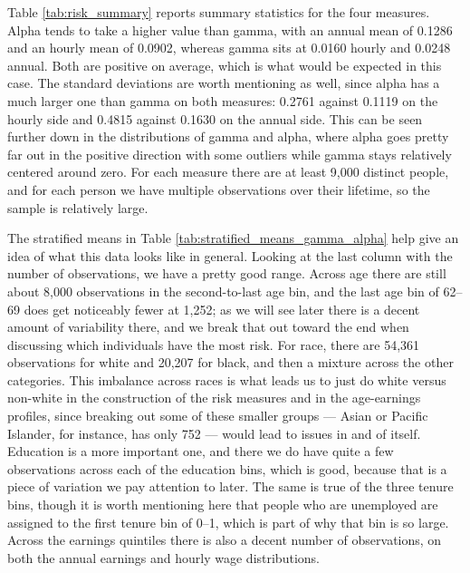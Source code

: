 \documentclass[12pt]{article}
\begin{document}
\begin{onehalfspace}
Table \ref{tab:risk_summary} reports summary statistics for the four measures. Alpha tends to take a higher value than gamma, with an annual mean of 0.1286 and an hourly mean of 0.0902, whereas gamma sits at 0.0160 hourly and 0.0248 annual. Both are positive on average, which is what would be expected in this case. The standard deviations are worth mentioning as well, since alpha has a much larger one than gamma on both measures: 0.2761 against 0.1119 on the hourly side and 0.4815 against 0.1630 on the annual side. This can be seen further down in the distributions of gamma and alpha, where alpha goes pretty far out in the positive direction with some outliers while gamma stays relatively centered around zero. For each measure there are at least 9,000 distinct people, and for each person we have multiple observations over their lifetime, so the sample is relatively large.


\begin{table}[H]
    \centering
    \caption{Summary Statistics of the Risk Measures}
    \label{tab:risk_summary}
    
\end{table}


The stratified means in Table \ref{tab:stratified_means_gamma_alpha} help give an idea of what this data looks like in general. Looking at the last column with the number of observations, we have a pretty good range. Across age there are still about 8,000 observations in the second-to-last age bin, and the last age bin of 62--69 does get noticeably fewer at 1,252; as we will see later there is a decent amount of variability there, and we break that out toward the end when discussing which individuals have the most risk. For race, there are 54,361 observations for white and 20,207 for black, and then a mixture across the other categories. This imbalance across races is what leads us to just do white versus non-white in the construction of the risk measures and in the age-earnings profiles, since breaking out some of these smaller groups --- Asian or Pacific Islander, for instance, has only 752 --- would lead to issues in and of itself. Education is a more important one, and there we do have quite a few observations across each of the education bins, which is good, because that is a piece of variation we pay attention to later. The same is true of the three tenure bins, though it is worth mentioning here that people who are unemployed are assigned to the first tenure bin of 0--1, which is part of why that bin is so large. Across the earnings quintiles there is also a decent number of observations, on both the annual earnings and hourly wage distributions.


\end{onehalfspace}
\end{document}
